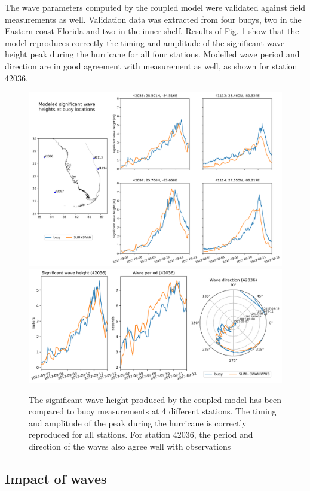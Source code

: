 \documentclass[11pt,a4paper]{article}
\begin{document}
The wave parameters computed by the coupled model were validated against field measurements as well. Validation data was extracted from four buoys, two in the Eastern coast Florida and two in the inner shelf. Results of Fig. \ref{fig:waves} show that the model reproduces correctly the timing and amplitude of the significant wave height peak during the hurricane for all four stations. Modelled wave period and direction are in good agreement with measurement as well, as shown for station 42036. 

\begin{figure}
    \centering
    \includegraphics[width=.95\textwidth]{fig/hsig_with_map_ww3.png}
    \includegraphics[width=.95\textwidth]{fig/val_waves.png}
    \caption{The significant wave height produced by the coupled model has been compared to buoy measurements at 4 different stations. The timing and amplitude of the peak during the hurricane is correctly reproduced for all stations. For station 42036, the period and direction of the waves also agree well with observations}
    \label{fig:waves}
\end{figure}

\subsection{Impact of waves}
\end{document}
